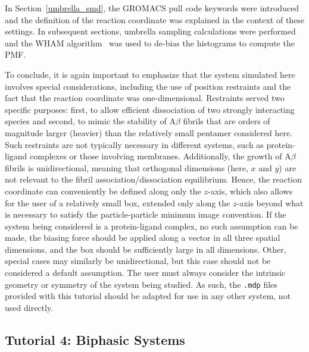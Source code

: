 \documentclass[9pt,tutorial]{livecoms}
\begin{document}
In Section~\ref{umbrella_smd}, the GROMACS pull code keywords were introduced and the definition of the reaction coordinate was explained in the context of these settings. In subsequent sections, umbrella sampling calculations were performed and the WHAM algorithm~\cite{Kumar1992} was used to de-bias the histograms to compute the PMF.

To conclude, it is again important to emphasize that the system simulated here involves special considerations, including the use of position restraints and the fact that the reaction coordinate was one-dimensional. Restraints served two specific purposes: first, to allow efficient dissociation of two strongly interacting species and second, to mimic the stability of A$\beta$ fibrils that are orders of magnitude larger (heavier) than the relatively small pentamer considered here. Such restraints are not typically necessary in different systems, such as protein-ligand complexes or those involving membranes. Additionally, the growth of A$\beta$ fibrils is unidirectional, meaning that orthogonal dimensions (here, $x$ and $y$) are not relevant to the fibril association/dissociation equilibrium. Hence, the reaction coordinate can conveniently be defined along only the $z$-axis, which also allows for the user of a relatively small box, extended only along the $z$-axis beyond what is necessary to satisfy the particle-particle minimum image convention. If the system being considered is a protein-ligand complex, no such assumption can be made, the biasing force should be applied along a vector in all three spatial dimensions, and the box should be sufficiently large in all dimensions. Other, special cases may similarly be unidirectional, but this case should not be considered a default assumption. The user must always consider the intrinsic geometry or symmetry of the system being studied. As such, the \texttt{.mdp} files provided with this tutorial should be adapted for use in any other system, not used directly.



\subsection{Tutorial 4: Biphasic Systems} \label{biphasic}
\end{document}
